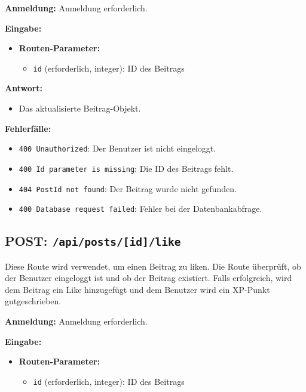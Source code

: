 \documentclass[a4paper,12pt]{article}
\begin{document}
\textbf{Anmeldung:} Anmeldung erforderlich.

\textbf{Eingabe:}
\begin{itemize}
    \item \textbf{Routen-Parameter:}
    \begin{itemize}
        \item \texttt{id} (erforderlich, integer):
            ID des Beitrags
    \end{itemize}
\end{itemize}

\textbf{Antwort:}
\begin{itemize}
    \item Das aktualisierte Beitrag-Objekt.
\end{itemize}

\textbf{Fehlerfälle:}
\begin{itemize}
    \item \texttt{400 Unauthorized}:
        Der Benutzer ist nicht eingeloggt.
    \item \texttt{400 Id parameter is missing}:
        Die ID des Beitrags fehlt.
    \item \texttt{404 PostId not found}:
        Der Beitrag wurde nicht gefunden.
    \item \texttt{400 Database request failed}:
        Fehler bei der Datenbankabfrage.
\end{itemize}

\newpage
\subsection{POST: \texttt{/api/posts/[id]/like}}

Diese Route wird verwendet, um einen Beitrag zu liken. Die Route überprüft, ob
der Benutzer eingeloggt ist und ob der Beitrag existiert. Falls erfolgreich,
wird dem Beitrag ein Like hinzugefügt und dem Benutzer wird ein XP-Punkt
gutgeschrieben.

\textbf{Anmeldung:} Anmeldung erforderlich.

\textbf{Eingabe:}
\begin{itemize}
    \item \textbf{Routen-Parameter:}
    \begin{itemize}
        \item \texttt{id} (erforderlich, integer):
            ID des Beitrags
    \end{itemize}
\end{itemize}
\end{document}
